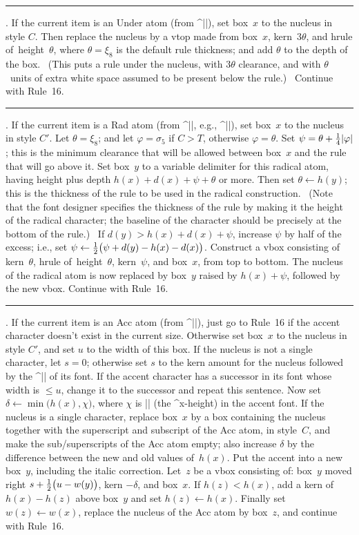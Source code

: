 \rule 10. If the current item is an Under atom (from ^|\underline|), set
box~$x$ to the nucleus in style $C$. Then replace the nucleus by a vtop
made from box~$x$, kern~$3\theta$, and hrule of~height~$\theta$,
where $\theta=\xi_8$ is the default rule thickness; and add $\theta$ to the
depth of the box. \ (This puts a rule under the nucleus, with $3\theta$
clearance, and with $\theta$~units of extra white space assumed to be
present below the rule.) \ Continue with Rule~16.

\rule 11. If the current item is a Rad atom (from ^|\radical|, e.g.,
^|\sqrt|), set box~$x$ to the nucleus in style $C'$. Let $\theta=\xi_8$;
and let $\varphi=\sigma_5$ if $C>T$, otherwise $\varphi=\theta$.
Set $\psi=\theta+{1\over4}\vert\varphi\vert$; this is the minimum
clearance that will be allowed between box~$x$ and the rule that will go
above it. Set box~$y$ to a variable delimiter for this radical atom, having
height plus depth $h(x)+d(x)+\psi+\theta$ or more. Then set $\theta\leftarrow
h(y)$; this is the thickness of the rule to be used in the radical
construction. \ (Note that the font designer specifies the thickness of
the rule by making it the height of the radical character; the baseline
of the character should be precisely at the bottom of the rule.) \
If $d(y)>h(x)+d(x)+\psi$, increase $\psi$ by half of the excess; i.e.,
set $\psi\leftarrow{1\over2}\bigl(\psi+d(y)-h(x)-d(x)\bigr)$. Construct
a vbox consisting of kern~$\theta$, hrule of~height~$\theta$, kern~$\psi$,
and box~$x$, from top to bottom. The nucleus of the radical atom is now
replaced by box~$y$ raised by $h(x)+\psi$, followed by the new vbox.
Continue with Rule~16.

\rule 12. If the current item is an Acc atom (from ^|\mathaccent|), just
go to Rule~16 if the accent character doesn't exist in the current size.
Otherwise set box~$x$ to the nucleus in style $C'$, and set $u$ to the
width of this box.  If the nucleus is not a single character, let $s=0$;
otherwise set $s$ to the kern amount for the nucleus followed by the
^|\skewchar| of its font.  If the accent character has a successor in its
font whose width is $\le u$, change it to the successor and repeat this
sentence.  Now set $\delta\leftarrow \min\bigl(h(x),\chi\bigr)$, where
$\chi$ is |\fontdimen5| (the ^{x-height}) in the accent font.  If the
nucleus is a single character, replace box~$x$ by a box containing the
nucleus together with the superscript and subscript of the Acc atom, in
style~$C$, and make the sub/superscripts of the Acc atom empty; also
increase $\delta$ by the difference between the new and old values
of~$h(x)$. Put the accent into a new box~$y$, including the italic
correction.  Let~$z$ be a vbox consisting of: box~$y$ moved right
$s+{1\over2}\bigl(u-w(y)\bigr)$, kern $-\delta$, and box~$x$. If
$h(z)<h(x)$, add a kern of $h(x)-h(z)$ above box~$y$ and set $h(z)\gets
h(x)$. Finally set $w(z)\gets w(x)$, replace the nucleus of the Acc atom
by box~$z$, and continue with Rule~16.

